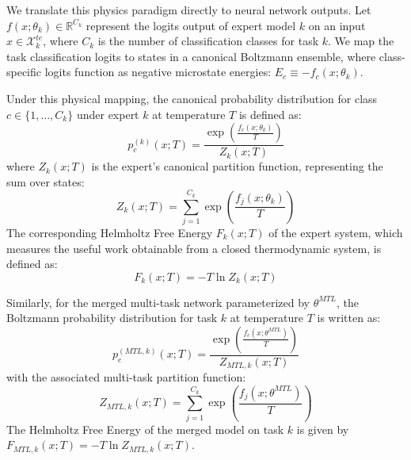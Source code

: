 We translate this physics paradigm directly to neural network outputs. Let $f(x; \theta_k) \in \mathbb{R}^{C_k}$ represent the logits output of expert model $k$ on an input $x \in \mathcal{X}_k^{te}$, where $C_k$ is the number of classification classes for task $k$. We map the task classification logits to states in a canonical Boltzmann ensemble, where class-specific logits function as negative microstate energies: $E_c \equiv -f_c(x; \theta_k)$.

Under this physical mapping, the canonical probability distribution for class $c \in \{1, \dots, C_k\}$ under expert $k$ at temperature $T$ is defined as:
\begin{equation}
\label{eq:boltz_expert}
p_c^{(k)}(x; T) = \frac{\exp\left( \frac{f_c(x; \theta_k)}{T} \right)}{Z_k(x; T)}
\end{equation}
where $Z_k(x; T)$ is the expert's canonical partition function, representing the sum over states:
\begin{equation}
\label{eq:partition_expert}
Z_k(x; T) = \sum_{j=1}^{C_k} \exp\left( \frac{f_j(x; \theta_k)}{T} \right)
\end{equation}
The corresponding Helmholtz Free Energy $F_k(x; T)$ of the expert system, which measures the useful work obtainable from a closed thermodynamic system, is defined as:
\begin{equation}
\label{eq:free_energy_expert}
F_k(x; T) = -T \ln Z_k(x; T)
\end{equation}

Similarly, for the merged multi-task network parameterized by $\theta^{MTL}$, the Boltzmann probability distribution for task $k$ at temperature $T$ is written as:
\begin{equation}
\label{eq:boltz_merged}
p_c^{(MTL, k)}(x; T) = \frac{\exp\left( \frac{f_c(x; \theta^{MTL})}{T} \right)}{Z_{MTL, k}(x; T)}
\end{equation}
with the associated multi-task partition function:
\begin{equation}
\label{eq:partition_merged}
Z_{MTL, k}(x; T) = \sum_{j=1}^{C_k} \exp\left( \frac{f_j(x; \theta^{MTL})}{T} \right)
\end{equation}
The Helmholtz Free Energy of the merged model on task $k$ is given by $F_{MTL, k}(x; T) = -T \ln Z_{MTL, k}(x; T)$.

